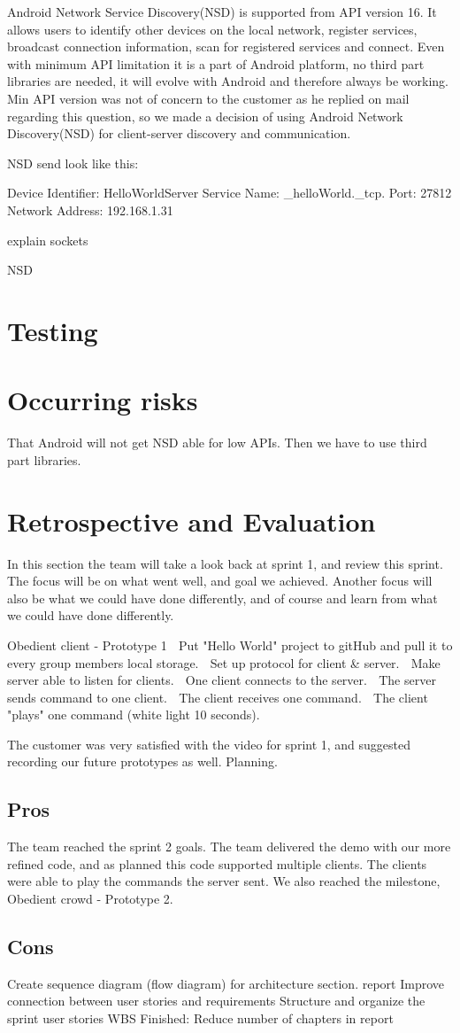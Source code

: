 Android Network Service Discovery(NSD) is supported from API version 16. 
It allows users to identify other devices on the local network, register services, broadcast connection information, scan for registered services and connect.
Even with minimum API limitation it is a part of Android platform, no third part libraries are needed, it will evolve with Android and therefore always be working.
Min API version was not of concern to the customer as he replied on mail regarding this question, so we made a decision of using Android Network Discovery(NSD) for client-server discovery and communication.

NSD send look like this:

Device Identifier: HelloWorldServer
Service Name: \_helloWorld.\_tcp.
Port: 27812
Network Address: 192.168.1.31

explain sockets

NSD
\section{Testing}

\section{Occurring risks}

That Android will not get NSD able for low APIs. 
Then we have to use third part libraries.

\section{Retrospective and Evaluation}
In this section the team will take a look back at sprint 1, and review this sprint. The focus will be on what went well, and goal we achieved. Another focus will also be what we could have done differently, and of course and learn from what we could have done differently.

Obedient client - Prototype 1
 Put "Hello World" project to gitHub and pull it to every group members
local storage.
 Set up protocol for client & server.
 Make server able to listen for clients.
 One client connects to the server.
 The server sends command to one client.
 The client receives one command.
 The client "plays" one command (white light 10 seconds).

The customer was very satisfied with the video for sprint 1, and suggested recording our future prototypes as well. 
Planning.

\subsection{Pros}
The team reached the sprint 2 goals. The team delivered the demo with our more refined code, and as planned this code supported multiple clients. The clients were able to play the commands the server sent. We also reached the milestone, Obedient crowd - Prototype 2.
\subsection{Cons}

Create sequence diagram (flow diagram) for architecture section.
report
Improve connection between user stories and requirements
Structure and organize the sprint user stories
WBS
Finished:
Reduce number of chapters in report
